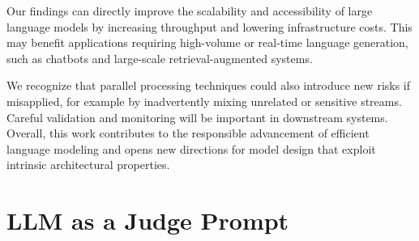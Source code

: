 \documentclass{article}
\theoremstyle{plain}
\theoremstyle{definition}
\theoremstyle{remark}
\begin{document}
Our findings can directly improve the scalability and accessibility of large language models by increasing throughput and lowering infrastructure costs. This may benefit applications requiring high-volume or real-time language generation, such as chatbots and large-scale retrieval-augmented systems.

We recognize that parallel processing techniques could also introduce new risks if misapplied, for example by inadvertently mixing unrelated or sensitive streams. Careful validation and monitoring will be important in downstream systems. Overall, this work contributes to the responsible advancement of efficient language modeling and opens new directions for model design that exploit intrinsic architectural properties.

\nocite{langley00}




\newpage
\appendix
\onecolumn
\section{LLM as a Judge Prompt}
\label{appendix:llm-as-a-judge-prompt}
\end{document}
